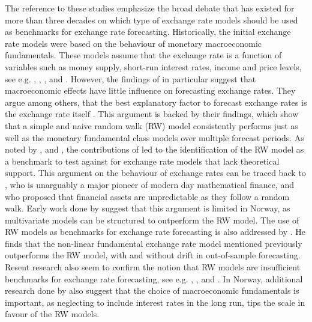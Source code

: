\documentclass[10pt]{article}
\numberwithin{equation}{section}
\numberwithin{table}{section}
\numberwithin{figure}{section}
\begin{document}
\begin{spacing}{1.5}
\indent The reference to these studies emphasize the broad debate that has existed for more than three decades on which type of exchange rate models should be used as benchmarks for exchange rate forecasting. Historically, the initial exchange rate models were based on the behaviour of monetary macroeconomic fundamentals. These models assume that the exchange rate is a function of variables such as money supply, short-run interest rates, income and price levels, see e.g. \cite{hicks1967monetary}, \cite{dornbusch1976expectations}, \cite{frenkel1976monetary}, \cite{mussa1976exchange} and \cite{bilson1978monetary}. However, the findings of \cite{meese1983out,meese1983empirical} in particular suggest that macroeconomic effects have little influence on forecasting exchange rates. They argue among others, that the best explanatory factor to forecast exchange rates is the exchange rate itself \citep{Retief2015}. This argument is backed by their findings, which show that a simple and naive random walk (RW) model consistently performs just as well as the monetary fundamental class models over multiple forecast periods. As noted by \cite{engel1994can}, \cite{isard1995exchange} and \cite{evans2005meese}, the contributions of \cite{meese1983out,meese1983empirical} led to the identification of the RW model as a benchmark to test against for exchange rate models that lack theoretical support. This argument on the behaviour of exchange rates can be traced back to \cite{bachelier1900theory}, who is unarguably a major pioneer of modern day mathematical finance, and who proposed that financial assets are unpredictable as they follow a random walk. Early work done by \cite{reinton1999out} suggest that this argument is limited in Norway, as multivariate models can be structured to outperform the RW model. The use of RW models as benchmarks for exchange rate forecasting is also addressed by \cite{akram2000does,akram2004oil}. He finds that the non-linear fundamental exchange rate model mentioned previously outperforms the RW model, with and without drift in out-of-sample forecasting. Resent research also seem to confirm the notion that RW models are insufficient benchmarks for exchange rate forecasting, see e.g. \cite{wu2001real}, \cite{alvarez2007if}, \cite{bissoondeeal2009monetary} and \cite{Retief2015}. In Norway, additional research done by \cite{bjornland2006importance} also suggest that the choice of macroeconomic fundamentals is important, as neglecting to include interest rates in the long run, tips the scale in favour of the RW models.


\end{spacing}
\end{document}

